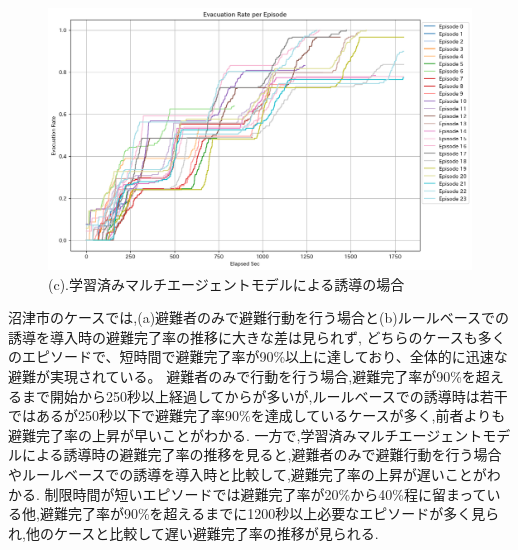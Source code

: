 \begin{figure}[H]
  \vspace{1em} %
  \begin{minipage}{0.65\textwidth}
      \centering
      \includegraphics[width=\textwidth]{Figures/Numazu-AgentModel-ERE.png} %
      \caption{(c).学習済みマルチエージェントモデルによる誘導の場合}
      \label{fig:numazu-guid-graph-c}
  \end{minipage}
\end{figure}
沼津市のケースでは,(a)避難者のみで避難行動を行う場合と(b)ルールベースでの誘導を導入時の避難完了率の推移に大きな差は見られず,
どちらのケースも多くのエピソードで、短時間で避難完了率が90\%以上に達しており、全体的に迅速な避難が実現されている。
避難者のみで行動を行う場合,避難完了率が90\%を超えるまで開始から250秒以上経過してからが多いが,ルールベースでの誘導時は若干ではあるが250秒以下で避難完了率90\%を達成しているケースが多く,前者よりも避難完了率の上昇が早いことがわかる.
一方で,学習済みマルチエージェントモデルによる誘導時の避難完了率の推移を見ると,避難者のみで避難行動を行う場合やルールベースでの誘導を導入時と比較して,避難完了率の上昇が遅いことがわかる.
制限時間が短いエピソードでは避難完了率が20\%から40\%程に留まっている他,避難完了率が90\%を超えるまでに1200秒以上必要なエピソードが多く見られ,他のケースと比較して遅い避難完了率の推移が見られる.

